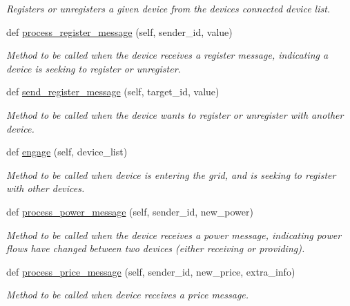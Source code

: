 \begin{DoxyCompactItemize}
\begin{DoxyCompactList}\small\item\em Registers or unregisters a given device from the device\textquotesingle{}s connected device list. \end{DoxyCompactList}\item 
def \hyperlink{class_build_1_1_objects_1_1device_1_1_device_ac665d015021b9efa42b734d0cc637304}{process\+\_\+register\+\_\+message} (self, sender\+\_\+id, value)
\begin{DoxyCompactList}\small\item\em Method to be called when the device receives a register message, indicating a device is seeking to register or unregister. \end{DoxyCompactList}\item 
def \hyperlink{class_build_1_1_objects_1_1device_1_1_device_a0acf2d71b9378f7f59e99c1b06c3c23a}{send\+\_\+register\+\_\+message} (self, target\+\_\+id, value)
\begin{DoxyCompactList}\small\item\em Method to be called when the device wants to register or unregister with another device. \end{DoxyCompactList}\item 
def \hyperlink{class_build_1_1_objects_1_1device_1_1_device_a3c71e4e2948f82a8444b2bcb3e6be504}{engage} (self, device\+\_\+list)
\begin{DoxyCompactList}\small\item\em Method to be called when device is entering the grid, and is seeking to register with other devices. \end{DoxyCompactList}\item 
def \hyperlink{class_build_1_1_objects_1_1device_1_1_device_af90a8b21aab7e60dc6ca1dcd7fe00b6f}{process\+\_\+power\+\_\+message} (self, sender\+\_\+id, new\+\_\+power)
\begin{DoxyCompactList}\small\item\em Method to be called when the device receives a power message, indicating power flows have changed between two devices (either receiving or providing). \end{DoxyCompactList}\item 
def \hyperlink{class_build_1_1_objects_1_1device_1_1_device_ab4a83ea60755c15f89dcbff7a10f55cc}{process\+\_\+price\+\_\+message} (self, sender\+\_\+id, new\+\_\+price, extra\+\_\+info)
\begin{DoxyCompactList}\small\item\em Method to be called when device receives a price message. \end{DoxyCompactList}\item 

\end{DoxyCompactItemize}
